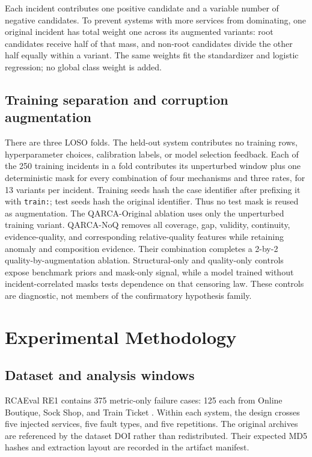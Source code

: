 \documentclass[runningheads]{llncs}
\begin{document}
Each incident contributes one positive candidate and a variable number of
negative candidates. To prevent systems with more services from dominating,
one original incident has total weight one across its augmented variants: root
candidates receive half of that mass, and non-root candidates divide the other
half equally within a variant. The same weights fit the standardizer and
logistic regression; no global class weight is added.

\subsection{Training separation and corruption augmentation}

There are three LOSO folds. The held-out system contributes no training rows,
hyperparameter choices, calibration labels, or model selection feedback. Each
of the 250 training incidents in a fold contributes its unperturbed window plus one
deterministic mask for every combination of four mechanisms and three rates,
for 13 variants per incident. Training seeds hash the case identifier after
prefixing it with \texttt{train:}; test seeds hash the original identifier. Thus no
test mask is reused as augmentation. The QARCA-Original ablation uses only the
unperturbed training variant. QARCA-NoQ removes all coverage, gap, validity,
continuity, evidence-quality, and corresponding relative-quality features
while retaining anomaly and composition evidence. Their combination completes
a 2-by-2 quality-by-augmentation ablation. Structural-only and quality-only
controls expose benchmark priors and mask-only signal, while a model trained
without incident-correlated masks tests dependence on that censoring law. These
controls are diagnostic, not members of the confirmatory hypothesis family.

\section{Experimental Methodology}

\subsection{Dataset and analysis windows}

RCAEval RE1 contains 375 metric-only failure cases: 125 each from Online
Boutique, Sock Shop, and Train Ticket \cite{rcaeval2025}. Within each system,
the design crosses five injected services, five fault types, and five
repetitions. The original archives are referenced by the dataset DOI rather
than redistributed. Their expected MD5 hashes and extraction layout are
recorded in the artifact manifest.
\end{document}
